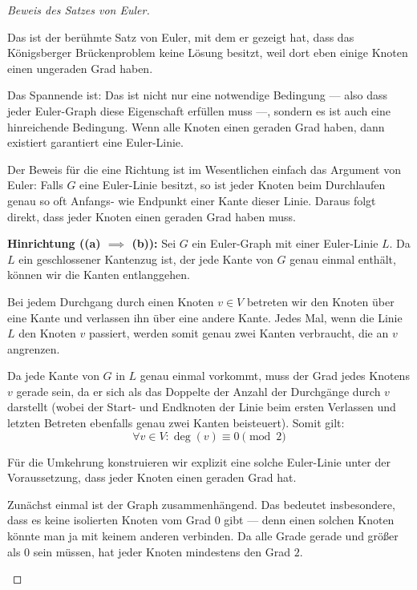 \begin{proof}[Beweis des Satzes von Euler]
\begin{spoken-clean}[00:08:55 - 00:11:15]
Das ist der berühmte Satz von Euler, mit dem er gezeigt hat, dass das Königsberger Brückenproblem keine Lösung besitzt, weil dort eben einige Knoten einen ungeraden Grad haben.

Das Spannende ist: Das ist nicht nur eine notwendige Bedingung --- also dass jeder Euler-Graph diese Eigenschaft erfüllen muss ---, sondern es ist auch eine hinreichende Bedingung. Wenn alle Knoten einen geraden Grad haben, dann existiert garantiert eine Euler-Linie.

Der Beweis für die eine Richtung ist im Wesentlichen einfach das Argument von Euler: Falls $G$ eine Euler-Linie besitzt, so ist jeder Knoten beim Durchlaufen genau so oft Anfangs- wie Endpunkt einer Kante dieser Linie. Daraus folgt direkt, dass jeder Knoten einen geraden Grad haben muss.
\end{spoken-clean}

\begin{math-stroke}
\textbf{Hinrichtung (\texorpdfstring{\textbf{(a)} $\implies$ \textbf{(b)}}{a -> b}):}
Sei $G$ ein Euler-Graph mit einer Euler-Linie $L$. Da $L$ ein geschlossener Kantenzug ist, der jede Kante von $G$ genau einmal enthält, können wir die Kanten entlanggehen. 

Bei jedem Durchgang durch einen Knoten $v \in V$ betreten wir den Knoten über eine Kante und verlassen ihn über eine andere Kante. Jedes Mal, wenn die Linie $L$ den Knoten $v$ passiert, werden somit genau zwei Kanten verbraucht, die an $v$ angrenzen. 

Da jede Kante von $G$ in $L$ genau einmal vorkommt, muss der Grad jedes Knotens $v$ gerade sein, da er sich als das Doppelte der Anzahl der Durchgänge durch $v$ darstellt (wobei der Start- und Endknoten der Linie beim ersten Verlassen und letzten Betreten ebenfalls genau zwei Kanten beisteuert). Somit gilt:
\[
\forall v \in V \colon \deg(v) \equiv 0 \pmod 2
\]
\end{math-stroke}

\begin{spoken-clean}[00:11:15 - 00:13:38]
Für die Umkehrung konstruieren wir explizit eine solche Euler-Linie unter der Voraussetzung, dass jeder Knoten einen geraden Grad hat.

Zunächst einmal ist der Graph zusammenhängend. Das bedeutet insbesondere, dass es keine isolierten Knoten vom Grad $0$ gibt --- denn einen solchen Knoten könnte man ja mit keinem anderen verbinden. Da alle Grade gerade und größer als $0$ sein müssen, hat jeder Knoten mindestens den Grad $2$.


\end{spoken-clean}
\end{proof}
